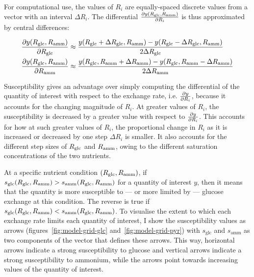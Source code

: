 For computational use, the values of $R_{i}$ are equally-spaced discrete values from a vector with an interval $\Delta R_{i}$.
The differential $\frac{\partial y(R_{\mathrm{glc}}, R_{\mathrm{amm}})}{\partial R_{i}}$ is thus approximated by central differences:

\begin{equation}
  \begin{aligned}
  \frac{\partial y(R_{\mathrm{glc}}, R_{\mathrm{amm}})}{\partial R_{\mathrm{glc}}} &\approx \frac{y(R_{\mathrm{glc}} + \Delta R_{\mathrm{glc}}, R_{\mathrm{amm}}) - y(R_{\mathrm{glc}} - \Delta R_{\mathrm{glc}}, R_{\mathrm{amm}})}{2\Delta R_{\mathrm{glc}}}\\
  \frac{\partial y(R_{\mathrm{glc}}, R_{\mathrm{amm}})}{\partial R_{\mathrm{amm}}} &\approx \frac{y(R_{\mathrm{glc}}, R_{\mathrm{amm}} + \Delta R_{\mathrm{amm}}) - y(R_{\mathrm{glc}}, R_{\mathrm{amm}} - \Delta R_{\mathrm{amm}})}{2\Delta R_{\mathrm{amm}}}
  \end{aligned}
  \label{eq:model-central-difference}
\end{equation}

Susceptibility gives an advantage over simply computing the differential of the quantity of interest with respect to the exchange rate, i.e. $\frac{\partial y}{\partial R_{i}}$, because it accounts for the changing magnitude of $R_{i}$.
At greater values of $R_{i}$, the susceptibility is decreased by a greater value with respect to $\frac{\partial y}{\partial R_{i}}$.
This accounts for how at such greater values of $R_{i}$, the proportional change in $R_{i}$ as it is increased or decreased by one step $\Delta R_{i}$ is smaller.
It also accounts for the different step sizes of $R_{\mathrm{glc}}$ and $R_{\mathrm{amm}}$, owing to the different saturation concentrations of the two nutrients.

At a specific nutrient condition $(R_{\mathrm{glc}}, R_{\mathrm{amm}})$, if $s_{\mathrm{glc}}(R_{\mathrm{glc}}, R_{\mathrm{amm}}) > s_{\mathrm{amm}}(R_{\mathrm{glc}}, R_{\mathrm{amm}})$ for a quantity of interest $y$, then it means that the quantity is more susceptible to --- or more limited by --- glucose exchange at this condition.
The reverse is true if $s_{\mathrm{glc}}(R_{\mathrm{glc}}, R_{\mathrm{amm}}) < s_{\mathrm{amm}}(R_{\mathrm{glc}}, R_{\mathrm{amm}})$.
To visualise the extent to which each exchange rate limits each quantity of interest, I show the susceptibility values as arrows (figures~\ref{fig:model-grid-glc} and~\ref{fig:model-grid-pyr}) with $s_{\mathrm{glc}}$ and $s_{\mathrm{amm}}$ as two components of the vector that defines these arrows.
This way, horizontal arrows indicate a strong susceptibility to glucose and vertical arrows indicate a strong susceptibility to ammonium, while the arrows point towards increasing values of the quantity of interest.

